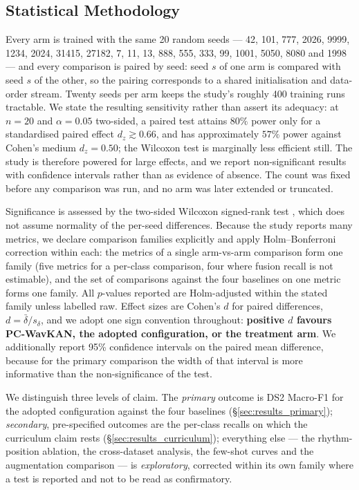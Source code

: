 \documentclass[journal,twoside,web]{ieeecolor}
\begin{document}
\subsection{Statistical Methodology}
\label{sec:stats}
Every arm is trained with the same 20 random seeds --- 42, 101, 777, 2026, 9999, 1234, 2024, 31415, 27182, 7, 11, 13, 888, 555, 333, 99, 1001, 5050, 8080 and 1998 --- and every comparison is paired by seed: seed $s$ of one arm is compared with seed $s$ of the other, so the pairing corresponds to a shared initialisation and data-order stream. Twenty seeds per arm keeps the study's roughly 400 training runs tractable. We state the resulting sensitivity rather than assert its adequacy: at $n=20$ and $\alpha=0.05$ two-sided, a paired test attains $80\%$ power only for a standardised paired effect $d_z \gtrsim 0.66$, and has approximately $57\%$ power against Cohen's medium $d_z=0.50$; the Wilcoxon test is marginally less efficient still. The study is therefore powered for large effects, and we report non-significant results with confidence intervals rather than as evidence of absence. The count was fixed before any comparison was run, and no arm was later extended or truncated.

Significance is assessed by the two-sided Wilcoxon signed-rank test \cite{wilcoxon_individual_1945}, which does not assume normality of the per-seed differences. Because the study reports many metrics, we declare comparison families explicitly and apply Holm--Bonferroni correction \cite{holm_simple_1979} within each: the metrics of a single arm-vs-arm comparison form one family (five metrics for a per-class comparison, four where fusion recall is not estimable), and the set of comparisons against the four baselines on one metric forms one family. All $p$-values reported are Holm-adjusted within the stated family unless labelled raw. Effect sizes are Cohen's $d$ \cite{cohen_statistical_1988} for paired differences, $d = \bar{\delta}/s_\delta$, and we adopt one sign convention throughout: \textbf{positive $d$ favours PC-WavKAN, the adopted configuration, or the treatment arm}. We additionally report 95\% confidence intervals on the paired mean difference, because for the primary comparison the width of that interval is more informative than the non-significance of the test.

We distinguish three levels of claim. The \emph{primary} outcome is DS2 Macro-F1 for the adopted configuration against the four baselines (\S\ref{sec:results_primary}); \emph{secondary}, pre-specified outcomes are the per-class recalls on which the curriculum claim rests (\S\ref{sec:results_curriculum}); everything else --- the rhythm-position ablation, the cross-dataset analysis, the few-shot curves and the augmentation comparison --- is \emph{exploratory}, corrected within its own family where a test is reported and not to be read as confirmatory.
\end{document}
